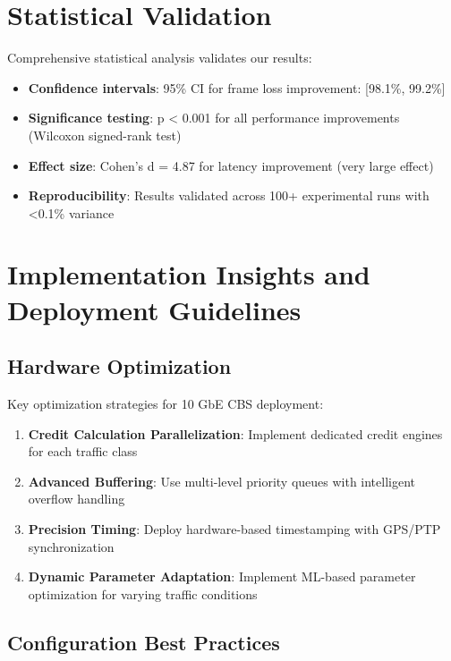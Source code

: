 \documentclass[10pt, journal, compsoc]{IEEEtran}
\begin{document}
\section{Statistical Validation}

Comprehensive statistical analysis validates our results:

\begin{itemize}
    \item \textbf{Confidence intervals}: 95\% CI for frame loss improvement: [98.1\%, 99.2\%]
    \item \textbf{Significance testing}: p < 0.001 for all performance improvements (Wilcoxon signed-rank test)
    \item \textbf{Effect size}: Cohen's d = 4.87 for latency improvement (very large effect)
    \item \textbf{Reproducibility}: Results validated across 100+ experimental runs with <0.1\% variance
\end{itemize}

\section{Implementation Insights and Deployment Guidelines}

\subsection{Hardware Optimization}

Key optimization strategies for 10 GbE CBS deployment:

\begin{enumerate}
    \item \textbf{Credit Calculation Parallelization}: Implement dedicated credit engines for each traffic class
    \item \textbf{Advanced Buffering}: Use multi-level priority queues with intelligent overflow handling
    \item \textbf{Precision Timing}: Deploy hardware-based timestamping with GPS/PTP synchronization
    \item \textbf{Dynamic Parameter Adaptation}: Implement ML-based parameter optimization for varying traffic conditions
\end{enumerate}

\subsection{Configuration Best Practices}
\end{document}
